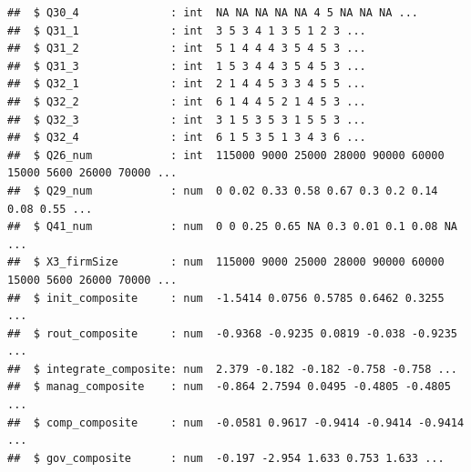 \documentclass[
]{article}
\newenvironment{Shaded}{\begin{snugshade}}{\end{snugshade}}
\newcommand{\CommentTok}[1]{\textcolor[rgb]{0.56,0.35,0.01}{\textit{#1}}}
\newcommand{\DataTypeTok}[1]{\textcolor[rgb]{0.13,0.29,0.53}{#1}}
\newcommand{\DecValTok}[1]{\textcolor[rgb]{0.00,0.00,0.81}{#1}}
\newcommand{\KeywordTok}[1]{\textcolor[rgb]{0.13,0.29,0.53}{\textbf{#1}}}
\newcommand{\NormalTok}[1]{#1}
\newcommand{\OperatorTok}[1]{\textcolor[rgb]{0.81,0.36,0.00}{\textbf{#1}}}
\newcommand{\StringTok}[1]{\textcolor[rgb]{0.31,0.60,0.02}{#1}}
\begin{document}
\begin{verbatim}
##  $ Q30_4              : int  NA NA NA NA NA 4 5 NA NA NA ...
##  $ Q31_1              : int  3 5 3 4 1 3 5 1 2 3 ...
##  $ Q31_2              : int  5 1 4 4 4 3 5 4 5 3 ...
##  $ Q31_3              : int  1 5 3 4 4 3 5 4 5 3 ...
##  $ Q32_1              : int  2 1 4 4 5 3 3 4 5 5 ...
##  $ Q32_2              : int  6 1 4 4 5 2 1 4 5 3 ...
##  $ Q32_3              : int  3 1 5 3 5 3 1 5 5 3 ...
##  $ Q32_4              : int  6 1 5 3 5 1 3 4 3 6 ...
##  $ Q26_num            : int  115000 9000 25000 28000 90000 60000 15000 5600 26000 70000 ...
##  $ Q29_num            : num  0 0.02 0.33 0.58 0.67 0.3 0.2 0.14 0.08 0.55 ...
##  $ Q41_num            : num  0 0 0.25 0.65 NA 0.3 0.01 0.1 0.08 NA ...
##  $ X3_firmSize        : num  115000 9000 25000 28000 90000 60000 15000 5600 26000 70000 ...
##  $ init_composite     : num  -1.5414 0.0756 0.5785 0.6462 0.3255 ...
##  $ rout_composite     : num  -0.9368 -0.9235 0.0819 -0.038 -0.9235 ...
##  $ integrate_composite: num  2.379 -0.182 -0.182 -0.758 -0.758 ...
##  $ manag_composite    : num  -0.864 2.7594 0.0495 -0.4805 -0.4805 ...
##  $ comp_composite     : num  -0.0581 0.9617 -0.9414 -0.9414 -0.9414 ...
##  $ gov_composite      : num  -0.197 -2.954 1.633 0.753 1.633 ...
\end{verbatim}

\begin{Shaded}
\end{Shaded}
\end{document}
